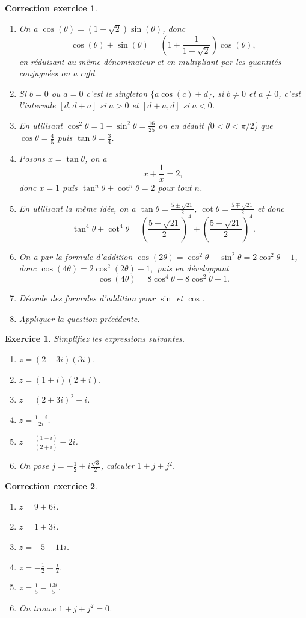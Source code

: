 \documentclass[12pt]{article}
\newtheorem{exercice}{\bf Exercice}
\newtheorem{correction}{\bf Correction exercice}
\newenvironment{exo}{
\begin{exercice}\smallskip\normalfont}{\end{exercice}
}
\newenvironment{cor}{
\begin{correction}\smallskip\normalfont}{\end{correction}
}
\newif\ifcorrige\corrigetrue
\begin{document}
\ifcorrige
\color{magenta}
\begin{cor}
  $\qquad$
\begin{enumerate}
\item On a $\cos(\theta)=(1+\sqrt{2})\sin(\theta)$, donc 
$$\cos(\theta)+\sin(\theta)=\left(1+\frac{1}{1+\sqrt{2}}\right) \cos(\theta),$$
en r\'eduisant au m\^eme d\'enominateur et en multipliant par les quantit\'es conjugu\'ees on a cqfd.
\item Si $b=0$ ou $a=0$ c'est le singleton $\{a\cos(c)+d\}$, si $b\neq 0$ et $a\neq 0$, c'est l'intervale $[d,d+a]$ si $a>0$ et $[d+a,d]$ si $a<0$.
\item En utilisant $\cos^2\theta=1-\sin^2\theta=\frac{16}{25}$ on en d\'eduit ($0<\theta<\pi/2$) que $\cos \theta= \frac{4}{5}$ puis
$\tan\theta=\frac{3}{4}$.
\item Posons $x=\tan\theta$, on a
$$x+\frac{1}{x}=2,$$
donc $x=1$ puis $\tan^n \theta +\cot^n\theta=2$ pour tout $n$.
\item En utilisant la m\^eme id\'ee, on a $\tan\theta=\frac{5\pm\sqrt{21}}{2}$, $\cot \theta=\frac{5\mp\sqrt{21}}{2}$ et donc
$$\tan^4 \theta +\cot^4\theta= \left (\frac{5+\sqrt{21}}{2}\right)^4+  \left (\frac{5-\sqrt{21}}{2}\right)^4.$$
\item On a par la formule d'addition $\cos(2\theta)=\cos^2 \theta-\sin^2 \theta=2\cos^2\theta-1$,
donc $\cos(4\theta)=2\cos^2(2\theta)-1,$
puis en d\'eveloppant
$$\cos(4\theta)=8\cos^4 \theta-8\cos^2\theta+1. $$
\item D\'ecoule des formules d'addition pour $\sin$ et $\cos$.
\item Appliquer la question pr\'ec\'edente.
\end{enumerate}
\end{cor}
\color{black}
\fi

\begin{exo} Simplifiez les expressions suivantes.
\begin{enumerate}
\item $z=(2-3i)(3i)$.
 \item $z=(1+i)(2+i)$.
 \item $z=(2+3i)^2-i$.
 \item $z=\frac{1-i}{2i}$.
 \item $z=\frac{(1-i)}{(2+i)}-2i$.
 \item On pose $j=-\frac{1}{2}+i\frac{\sqrt{3}}{2}$, calculer $1+j+j^2$.
\end{enumerate}
 \end{exo}
 \ifcorrige
\color{magenta}
\begin{cor}
  $\qquad$
\begin{enumerate}
\item $z=9+6i$.
\item $z=1+3i$.
\item $z=-5-11i$.
\item $z=-\frac{1}{2}-\frac{i}{2}$.
\item $z=\frac{1}{5}-\frac{13i}{5}$.
\item On trouve $1+j+j^2=0$.
\end{enumerate}
\end{cor}
\color{black}
\fi
\end{document}
